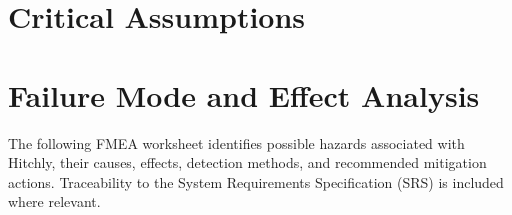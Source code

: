 \documentclass{article}
\begin{document}
\section{Critical Assumptions}


\section{Failure Mode and Effect Analysis}

The following FMEA worksheet identifies possible hazards associated with Hitchly, their causes,
effects, detection methods, and recommended mitigation actions. Traceability to the System
Requirements Specification (SRS) is included where relevant.
\end{document}
